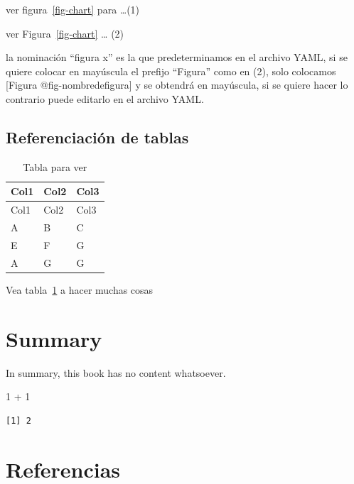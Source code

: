 \documentclass[
  12pt,
  letterpaper,
]{scrreprt}
\newenvironment{Shaded}{\begin{snugshade}}{\end{snugshade}}
\newcommand{\DecValTok}[1]{\textcolor[rgb]{0.68,0.00,0.00}{#1}}
\newcommand{\SpecialCharTok}[1]{\textcolor[rgb]{0.37,0.37,0.37}{#1}}
\begin{document}
ver figura~\ref{fig-chart} para \ldots(1)

ver Figura~\ref{fig-chart} \ldots{} (2)

la nominación ``figura x'' es la que predeterminamos en el archivo YAML,
si se quiere colocar en mayúscula el prefijo ``Figura'' como en (2),
solo colocamos {[}Figura @fig-nombredefigura{]} y se obtendrá en
mayúscula, si se quiere hacer lo contrario puede editarlo en el archivo
YAML.

\section{Referenciación de tablas}\label{referenciaciuxf3n-de-tablas}

\begin{longtable}[]{@{}lll@{}}
\caption{Tabla para ver}\label{tbl-letters}\tabularnewline
\toprule\noalign{}
Col1 & Col2 & Col3 \\
\midrule\noalign{}
\endfirsthead
\toprule\noalign{}
Col1 & Col2 & Col3 \\
\midrule\noalign{}
\endhead
\bottomrule\noalign{}
\endlastfoot
A & B & C \\
E & F & G \\
A & G & G \\
\end{longtable}

Vea tabla~\ref{tbl-letters} a hacer muchas cosas


\chapter{Summary}\label{summary}

In summary, this book has no content whatsoever.

\begin{Shaded}
\begin{Highlighting}[]
\DecValTok{1} \SpecialCharTok{+} \DecValTok{1}
\end{Highlighting}
\end{Shaded}

\begin{verbatim}
[1] 2
\end{verbatim}


\chapter*{Referencias}\label{referencias}
\end{document}
